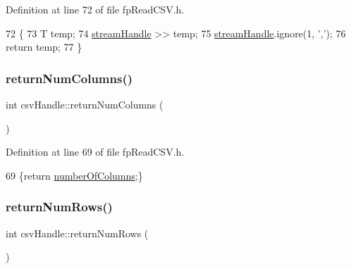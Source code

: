 Definition at line 72 of file fp\+Read\+C\+S\+V.\+h.


\begin{DoxyCode}
72                                     \{
73             T temp;
74             \hyperlink{classcsvHandle_ab2900581db37409635ccfd878693fb48}{streamHandle} >> temp;
75             \hyperlink{classcsvHandle_ab2900581db37409635ccfd878693fb48}{streamHandle}.ignore(1, \textcolor{charliteral}{','});
76             \textcolor{keywordflow}{return} temp;
77         \}
\end{DoxyCode}
\mbox{\label{classcsvHandle_a7dc362efe916e5a9707f26ad20d3c870}} 
\subsubsection{\texorpdfstring{return\+Num\+Columns()}{returnNumColumns()}}
{\footnotesize\ttfamily int csv\+Handle\+::return\+Num\+Columns (\begin{DoxyParamCaption}{ }\end{DoxyParamCaption})\hspace{0.3cm}{\ttfamily [inline]}}



Definition at line 69 of file fp\+Read\+C\+S\+V.\+h.


\begin{DoxyCode}
69 \{\textcolor{keywordflow}{return} \hyperlink{classcsvHandle_aee792b10c2ad6e21c68cfe84d6b7ff46}{numberOfColumns};\}
\end{DoxyCode}
\mbox{\label{classcsvHandle_a605aeef90b440e8c7b090999da3739a8}} 
\subsubsection{\texorpdfstring{return\+Num\+Rows()}{returnNumRows()}}
{\footnotesize\ttfamily int csv\+Handle\+::return\+Num\+Rows (\begin{DoxyParamCaption}{ }\end{DoxyParamCaption})\hspace{0.3cm}{\ttfamily [inline]}}



